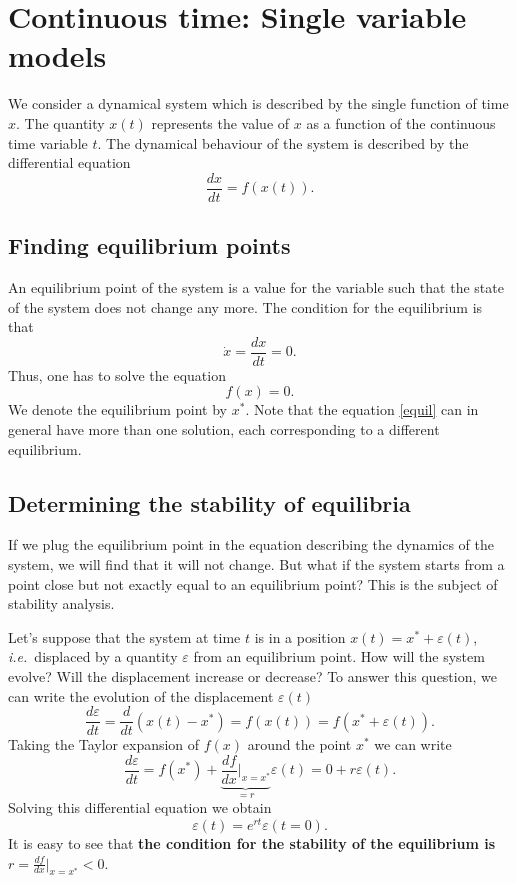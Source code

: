 \documentclass[a4paper]{article}\usepackage[]{graphicx}\usepackage[]{color}
\begin{document}
\section{Continuous time: Single variable models}
  We consider a dynamical system which is described by the single function of time $x$. The quantity $x(t)$ represents the value of $x$ as a function of the continuous time variable $t$.  The dynamical behaviour of the system is described by the differential equation
	\begin{equation}
		\frac{dx}{dt} = f(x(t)).
	\end{equation}
	
	\subsection{Finding equilibrium points}
	An equilibrium point of the system is a value for the variable such that the state of the system does not change any more. The condition for the equilibrium is that
	\begin{equation*}
		\dot{x} = \frac{dx}{dt} =0.
	\end{equation*}
	Thus, one has to solve the equation
	\begin{equation}
		\label{equil}
		f(x) = 0.
	\end{equation}
	We denote the equilibrium point by $x^*$. Note that the equation \ref{equil} can in general have more than one solution, each corresponding to a different  equilibrium.
	
	\subsection{Determining the stability of equilibria}
	If we plug the equilibrium point in the equation describing the dynamics of the system, we will find that it will not change. But what if the system starts from a point close but not exactly equal to an equilibrium point? This is the subject of stability analysis.
	
	Let's suppose that the system at time $t$ is in a position $x(t) = x^* + \varepsilon(t)$, \emph{i.e.}\ displaced by a quantity $\varepsilon$ from an equilibrium point. How will the system evolve? Will the displacement increase or decrease? To answer this question, we can write the evolution of the displacement $\varepsilon(t)$
	\begin{equation}
		\frac{d\varepsilon}{dt} = \frac{d}{dt}(x(t)-x^*) = f(x(t)) = f(x^* + \varepsilon(t)).
	\end{equation}
	Taking the Taylor expansion of  $f(x)$ around the point $x^*$ we can write
	\begin{equation}
		\frac{d\varepsilon}{dt} = f(x^*) + \underbrace{\frac{df}{dx}|_{x=x^*}}_{= r} \varepsilon(t) = 0 + r \varepsilon(t).
	\end{equation}
	Solving this differential equation we obtain
	\begin{equation}
		\varepsilon(t) = e^{rt}\varepsilon(t=0).
	\end{equation}
	It is easy to see that {\bf the condition for the stability of the equilibrium is $r = \frac{df}{dx}|_{x=x^*}  < 0$}.
\end{document}
